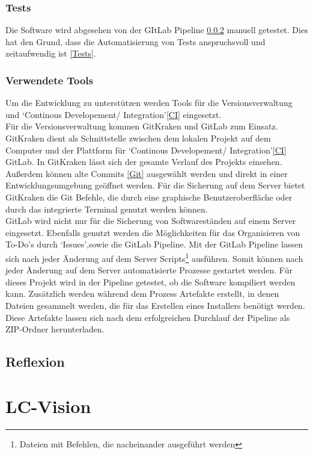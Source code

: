 \documentclass[12pt,a4paper]{article}
\begin{document}
\subsubsection{Tests}
Die Software wird abgesehen von der GItLab Pipeline \ref{Tools} manuell getestet. Dies hat den Grund, dass die Automatisierung von Tests anspruchsvoll und zeitaufwendig ist \ref{Tests}.
\subsubsection{Verwendete Tools}
\label{Tools}
Um die Entwicklung zu unterstützen werden Tools für die Versionsverwaltung und \lq Continous Developement/ Integration\rq\space \ref{CI} eingesetzt.\\
Für die Versionsverwaltung kommen GitKraken und GitLab zum Einsatz. GitKraken dient als Schnittstelle zwischen dem lokalen Projekt auf dem Computer und der Plattform für \lq Continous Developement/ Integration\rq\space \ref{CI} GitLab. In GitKraken lässt sich der gesamte Verlauf des Projekts einsehen. Außerdem können alte Commits \ref{Git} ausgewählt werden und direkt in einer Entwicklungsumgebung geöffnet werden. Für die Sicherung auf dem Server bietet GitKraken die Git Befehle, die durch eine graphische Benutzeroberfläche oder durch das integrierte Terminal genutzt werden können.\\
GitLab wird nicht nur für die Sicherung von Softwareständen auf einem Server eingesetzt. Ebenfalls genutzt werden die Möglichkeiten für das Organisieren von To-Do's durch \lq Issues\rq ,\space sowie die GitLab Pipeline. Mit der GitLab Pipeline lassen sich nach jeder Änderung auf dem Server Scripts\footnote{Dateien mit Befehlen, die nacheinander ausgeführt werden} ausführen. Somit können nach jeder Änderung auf dem Server automatisierte Prozesse gestartet werden. Für dieses Projekt wird in der Pipeline getestet, ob die Software kompiliert werden kann. Zusätzlich werden während dem Prozess Artefakte erstellt, in denen Dateien gesammelt werden, die für das Erstellen eines Installers benötigt werden. Diese Artefakte lassen sich nach dem erfolgreichen Durchlauf der Pipeline als ZIP-Ordner herunterladen.\\
\subsection{Reflexion}

\section{LC-Vision}
\newpage

\newpage


\end{document}
